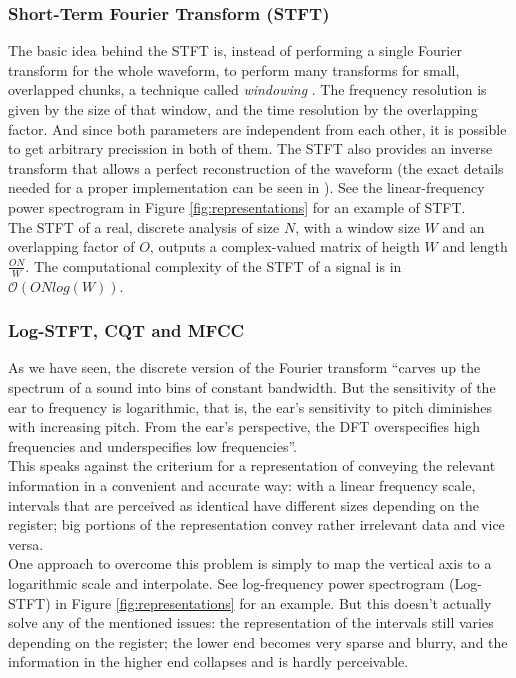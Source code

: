   \subsubsection{Short-Term Fourier Transform (STFT)}

  The basic idea behind the STFT is, instead of performing a single Fourier transform for the whole waveform, to perform many transforms for small, overlapped chunks, a technique called {\it windowing} \cite[p.459]{musimathics}. The frequency resolution is given by the size of that window, and the time resolution by the overlapping factor. And since both parameters are independent from each other, it is possible to get arbitrary precission in both of them. The STFT also provides an inverse transform that allows a perfect reconstruction of the waveform (the exact details needed for a proper implementation can be seen in \cite[ch.10]{musimathics}). See the linear-frequency power spectrogram in Figure \ref{fig:representations} for an example of STFT.\\

  The STFT of a real, discrete analysis of size \(N\), with a window size \(W\) and an overlapping factor of \(O\), outputs a complex-valued matrix of heigth \(W\) and length \(\frac{ON}{W}\). The computational complexity of the STFT of a signal is in \(\mathcal{O}(ON log(W))\).

  \subsubsection{Log-STFT, CQT and MFCC}

  As we have seen, the discrete version of the Fourier transform ``carves up the spectrum of a sound into bins of constant bandwidth. But the sensitivity of the ear to frequency is logarithmic, that is, the ear's sensitivity to pitch diminishes with increasing pitch. From the ear's perspective, the DFT overspecifies high frequencies and underspecifies low frequencies''\cite[p.154]{musimathics}.\\

  This speaks against the criterium for a representation of conveying the relevant information in a convenient and accurate way: with a linear frequency scale, intervals that are perceived as identical have different sizes depending on the register; big portions of the representation convey rather irrelevant data and vice versa.\\

  One approach to overcome this problem is simply to map the vertical axis to a logarithmic scale and interpolate. See log-frequency power spectrogram (Log-STFT) in Figure \ref{fig:representations} for an example. But this doesn't actually solve any of the mentioned issues: the representation of the intervals still varies depending on the register; the lower end becomes very sparse and blurry, and the information in the higher end collapses and is hardly perceivable.\\

